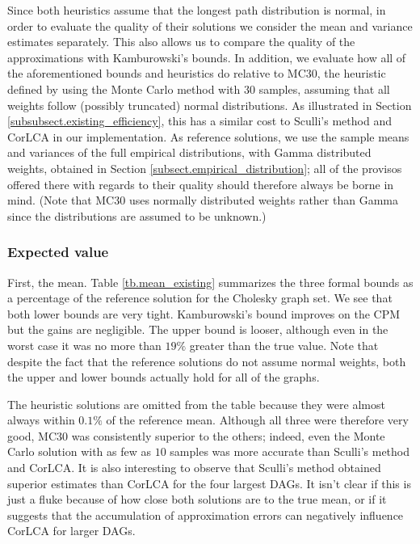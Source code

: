 \documentclass[12pt]{article}
\begin{document}
Since both heuristics assume that the longest path distribution is normal, in order to evaluate the quality of their solutions we consider the mean and variance estimates separately. This also allows us to compare the quality of the approximations with Kamburowski's bounds. In addition, we evaluate how all of the aforementioned bounds and heuristics do relative to MC30, the heuristic defined by using the Monte Carlo method with $30$ samples, assuming that all weights follow (possibly truncated) normal distributions. As illustrated in Section \ref{subsubsect.existing_efficiency}, this has a similar cost to Sculli's method and CorLCA in our implementation. As reference solutions, we use the sample means and variances of the full empirical distributions, with Gamma distributed weights, obtained in Section \ref{subsect.empirical_distribution}; all of the provisos offered there with regards to their quality should therefore always be borne in mind. (Note that MC30 uses normally distributed weights rather than Gamma since the distributions are assumed to be unknown.)

\subsubsection{Expected value}
\label{subsubsect.existing_mean}

First, the mean. Table \ref{tb.mean_existing} summarizes the three formal bounds as a percentage of the reference solution for the Cholesky graph set. We see that both lower bounds are very tight. Kamburowski's bound improves on the CPM but the gains are negligible. The upper bound is looser, although even in the worst case it was no more than $19\%$ greater than the true value. Note that despite the fact that the reference solutions do not assume normal weights, both the upper and lower bounds actually hold for all of the graphs.

The heuristic solutions are omitted from the table because they were almost always within $0.1\%$ of the reference mean. Although all three were therefore very good, MC30 was consistently superior to the others; indeed, even the Monte Carlo solution with as few as $10$ samples was more accurate than Sculli's method and CorLCA. It is also interesting to observe that Sculli's method obtained superior estimates than CorLCA for the four largest DAGs. It isn't clear if this is just a fluke because of how close both solutions are to the true mean, or if it suggests that the accumulation of approximation errors can negatively influence CorLCA for larger DAGs.
\end{document}
